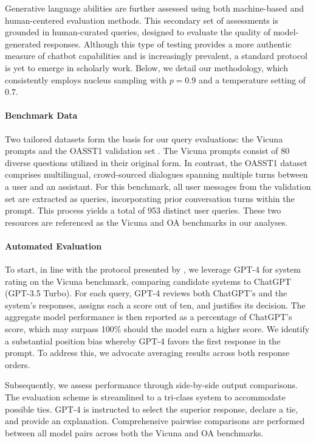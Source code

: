 Generative language abilities are further assessed using both machine-based and human-centered evaluation methods. This secondary set of assessments is grounded in human-curated queries, designed to evaluate the quality of model-generated responses. Although this type of testing provides a more authentic measure of chatbot capabilities and is increasingly prevalent, a standard protocol is yet to emerge in scholarly work. Below, we detail our methodology, which consistently employs nucleus sampling with $p=0.9$ and a temperature setting of $0.7$.

\paragraph{Benchmark Data} Two tailored datasets form the basis for our query evaluations: the Vicuna prompts \citep{vicuna2023} and the OASST1 validation set \citep{kopf2023openassistant}. The Vicuna prompts consist of 80 diverse questions utilized in their original form. In contrast, the OASST1 dataset comprises multilingual, crowd-sourced dialogues spanning multiple turns between a user and an assistant. For this benchmark, all user messages from the validation set are extracted as queries, incorporating prior conversation turns within the prompt. This process yields a total of 953 distinct user queries. These two resources are referenced as the Vicuna and OA benchmarks in our analyses.

\paragraph{Automated Evaluation} To start, in line with the protocol presented by \citet{vicuna2023}, we leverage GPT-4 for system rating on the Vicuna benchmark, comparing candidate systems to ChatGPT (GPT-3.5 Turbo). For each query, GPT-4 reviews both ChatGPT's and the system's responses, assigns each a score out of ten, and justifies its decision. The aggregate model performance is then reported as a percentage of ChatGPT's score, which may surpass 100\% should the model earn a higher score. We identify a substantial position bias whereby GPT-4 favors the first response in the prompt. To address this, we advocate averaging results across both response orders.

Subsequently, we assess performance through side-by-side output comparisons. The evaluation scheme is streamlined to a tri-class system to accommodate possible ties. GPT-4 is instructed to select the superior response, declare a tie, and provide an explanation. Comprehensive pairwise comparisons are performed between all model pairs across both the Vicuna and OA benchmarks.

